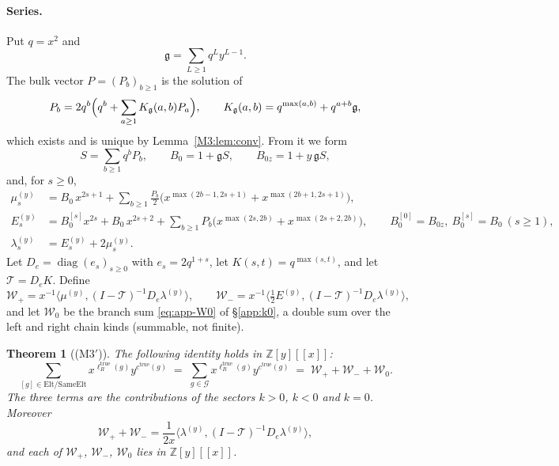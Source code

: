 \documentclass[11pt]{article}
\theoremstyle{plain}
\newtheorem{theorem}{Theorem}
\theoremstyle{definition}
\theoremstyle{remark}
\begin{document}
\paragraph{Series.}
Put $q=x^2$ and
\[
  \mathfrak g=\sum_{L\ge1}q^Ly^{L-1}.
\]
The bulk vector $P=(P_b)_{b\ge1}$ is the solution of
\begin{equation}\label{eq:app-bulk}
  P_b=2q^b\Bigl(q^b+\sum_{a\ge1}K_{\mathfrak g}(a,b)P_a\Bigr),\qquad
  K_{\mathfrak g}(a,b)=q^{\max(a,b)}+q^{a+b}\mathfrak g ,
\end{equation}
which exists and is unique by Lemma~\ref{M3:lem:conv}. From it we form
\[
  S=\sum_{b\ge1}q^bP_b,\qquad B_0=1+\mathfrak gS,\qquad B_{0z}=1+y\,\mathfrak gS,
\]
and, for $s\ge0$,
\begin{align}
  \mu^{(y)}_s&=B_0\,x^{2s+1}+\sum_{b\ge1}\frac{P_b}{2}\bigl(x^{\max(2b-1,2s+1)}+x^{\max(2b+1,2s+1)}\bigr),
  \label{eq:app-mu}\\
  E^{(y)}_s&=B_0^{[s]}x^{2s}+B_0\,x^{2s+2}+\sum_{b\ge1}P_b\bigl(x^{\max(2s,2b)}+x^{\max(2s+2,2b)}\bigr),
  \qquad B_0^{[0]}=B_{0z},\ B_0^{[s]}=B_0\ (s\ge1),\label{eq:app-E}\\
  \lambda^{(y)}_s&=E^{(y)}_s+2\mu^{(y)}_s .\label{eq:app-lambda}
\end{align}
Let $D_e=\operatorname{diag}(e_s)_{s\ge0}$ with $e_s=2q^{1+s}$, let $K(s,t)=q^{\max(s,t)}$,
and let $\mathcal T=D_eK$. Define
\[
  \mathcal W_+=x^{-1}\bigl\langle\mu^{(y)},(I-\mathcal T)^{-1}D_e\lambda^{(y)}\bigr\rangle,\qquad
  \mathcal W_-=x^{-1}\bigl\langle\tfrac12E^{(y)},(I-\mathcal T)^{-1}D_e\lambda^{(y)}\bigr\rangle,
\]
and let $\mathcal W_0$ be the branch sum \eqref{eq:app-W0} of \S\ref{app:k0}, a double sum over the
left and right chain kinds (summable, not finite).

\begin{theorem}[\textup{(M3$'$)}]\label{thm:M3prime}
The following identity holds in $\mathbb Z[y][[x]]$:
\[
  \sum_{[g]\in\mathrm{Elt}/\mathrm{SameElt}}x^{\ell_R^{\mathrm{true}}(g)}y^{c^{\mathrm{true}}(g)}
  \;=\;\sum_{g\in\mathcal G}x^{\ell_R^{\mathrm{true}}(g)}y^{c^{\mathrm{true}}(g)}
  \;=\;\mathcal W_++\mathcal W_-+\mathcal W_0 .
\]
The three terms are the contributions of the sectors $k>0$, $k<0$ and $k=0$. Moreover
\[
  \mathcal W_++\mathcal W_-=\frac1{2x}\bigl\langle\lambda^{(y)},(I-\mathcal T)^{-1}D_e\lambda^{(y)}\bigr\rangle ,
\]
and each of $\mathcal W_+$, $\mathcal W_-$, $\mathcal W_0$ lies in $\mathbb Z[y][[x]]$.
\end{theorem}
\end{document}

